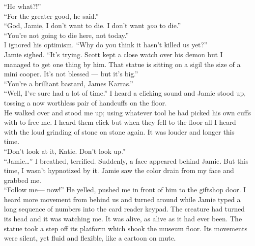 \documentclass[a5paper]{scrartcl}
\begin{document}
\enquote{He what?!}\\


\enquote{For the greater good, he said.}\\


\enquote{God, Jamie, I don't want to die. I don't want \textit{you} to die.}\\


\enquote{You're not going to die here, not today.}\\


I ignored his optimism. \enquote{Why do you think it hasn't killed us yet?}\\


Jamie sighed. \enquote{It's trying. Scott kept a close watch over his demon but I managed to get one thing by him. That statue is sitting on a sigil the size of a mini cooper. It's not blessed --- but it's big.}\\


\enquote{You're a brilliant bastard, James Karras.}\\


\enquote{Well, I've sure had a lot of time.} I heard a clicking sound and Jamie stood up, tossing a now worthless pair of handcuffs on the floor.\\


He walked over and stood me up; using whatever tool he had picked his own cuffs with to free me. I heard them click but when they fell to the floor all I heard with the loud grinding of stone on stone again. It was louder and longer this time.\\


\enquote{Don't look at it, Katie. Don't look up.}\\


\enquote{Jamie\dots } I breathed, terrified. Suddenly, a face appeared behind Jamie. But this time, I wasn't hypnotized by it. Jamie saw the color drain from my face and grabbed me.\\


\enquote{Follow me--- now!} He yelled, pushed me in front of him to the giftshop door. I heard more movement from behind us and turned around while Jamie typed a long sequence of numbers into the card reader keypad. The creature had turned its head and it was watching me. It was alive, as alive as it had ever been. The statue took a step off its platform which shook the museum floor. Its movements were silent, yet fluid and flexible, like a cartoon on mute.\\
\end{document}
